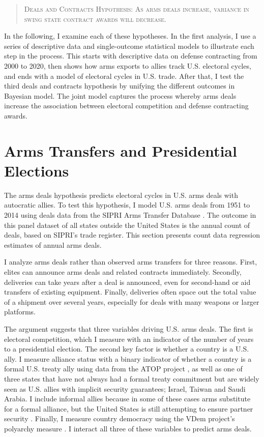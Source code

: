 \documentclass[12pt]{article}
\begin{document}
\begin{quote}
\textsc{Deals and Contracts Hypothesis: As arms deals increase, variance in swing state contract awards will decrease.}
\end{quote}


In the following, I examine each of these hypotheses. 
In the first analysis, I use a series of descriptive data and single-outcome statistical models to illustrate each step in the process.
This starts with descriptive data on defense contracting from 2000 to 2020, then shows how arms exports to allies track U.S. electoral cycles, and ends with a model of electoral cycles in U.S. trade. 
After that, I test the third deals and contracts hypothesis by unifying the different outcomes in Bayesian model.
The joint model captures the process whereby arms deals increase the association between electoral competition and defense contracting awards. 



\section{Arms Transfers and Presidential Elections}


The arms deals hypothesis predicts electoral cycles in U.S. arms deals with autocratic allies.
To test this hypothesis, I model U.S. arms deals from 1951 to 2014 using deals data from the SIPRI Arms Transfer Database \citep{SIPRI2021}.
The outcome in this panel dataset of all states outside the United States is the annual count of deals, based on SIPRI's trade register. 
This section presents count data regression estimates of annual arms deals. 


I analyze arms deals rather than observed arms transfers for three reasons.
First, elites can announce arms deals and related contracts immediately. 
Secondly, deliveries can take years after a deal is announced, even for second-hand or aid transfers of existing equipment. 
Finally, deliveries often space out the total value of a shipment over several years, especially for deals with many weapons or larger platforms. 


The argument suggests that three variables driving U.S. arms deals. 
The first is electoral competition, which I measure with an indicator of the number of years to a presidential election. 
The second key factor is whether a country is a U.S. ally. 
I measure alliance status with a binary indicator of whether a country is a formal U.S. treaty ally using data from the ATOP project \citep{Leedsetal2002}, as well as one of three states that have not always had a formal treaty commitment but are widely seen as U.S. allies with implicit security guarantees; Israel, Taiwan and Saudi Arabia. 
I include informal allies because in some of these cases arms substitute for a formal alliance, but the United States is still attempting to ensure partner security \citep{Yarhi-Miloetal2016}. 
Finally, I measure country democracy using the VDem project's polyarchy measure \citep{Coppedgeetal2008}. 
I interact all three of these variables to predict arms deals. 
\end{document}

